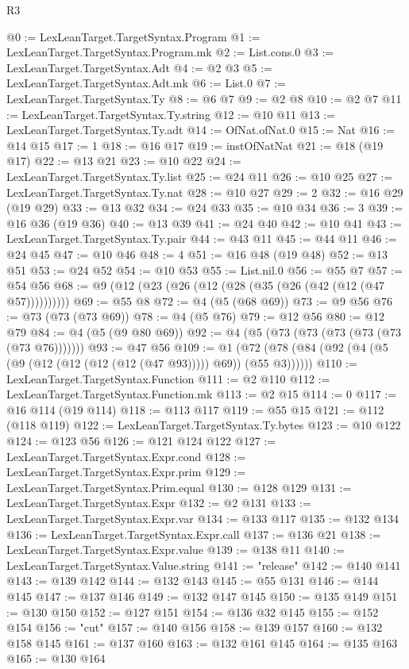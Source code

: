 \begin{lexlean}{R3}
\begin{coremodule}
@0 := LexLeanTarget.TargetSyntax.Program
@1 := LexLeanTarget.TargetSyntax.Program.mk
@2 := List.cons.{0}
@3 := LexLeanTarget.TargetSyntax.Adt
@4 := @2 @3
@5 := LexLeanTarget.TargetSyntax.Adt.mk
@6 := List.{0}
@7 := LexLeanTarget.TargetSyntax.Ty
@8 := @6 @7
@9 := @2 @8
@10 := @2 @7
@11 := LexLeanTarget.TargetSyntax.Ty.string
@12 := @10 @11
@13 := LexLeanTarget.TargetSyntax.Ty.adt
@14 := OfNat.ofNat.{0}
@15 := Nat
@16 := @14 @15
@17 := 1
@18 := @16 @17
@19 := instOfNatNat
@21 := @18 (@19 @17)
@22 := @13 @21
@23 := @10 @22
@24 := LexLeanTarget.TargetSyntax.Ty.list
@25 := @24 @11
@26 := @10 @25
@27 := LexLeanTarget.TargetSyntax.Ty.nat
@28 := @10 @27
@29 := 2
@32 := @16 @29 (@19 @29)
@33 := @13 @32
@34 := @24 @33
@35 := @10 @34
@36 := 3
@39 := @16 @36 (@19 @36)
@40 := @13 @39
@41 := @24 @40
@42 := @10 @41
@43 := LexLeanTarget.TargetSyntax.Ty.pair
@44 := @43 @11
@45 := @44 @11
@46 := @24 @45
@47 := @10 @46
@48 := 4
@51 := @16 @48 (@19 @48)
@52 := @13 @51
@53 := @24 @52
@54 := @10 @53
@55 := List.nil.{0}
@56 := @55 @7
@57 := @54 @56
@68 := @9 (@12 (@23 (@26 (@12 (@28 (@35 (@26 (@42 (@12 (@47 @57))))))))))
@69 := @55 @8
@72 := @4 (@5 (@68 @69))
@73 := @9 @56
@76 := @73 (@73 (@73 @69))
@78 := @4 (@5 @76)
@79 := @12 @56
@80 := @12 @79
@84 := @4 (@5 (@9 @80 @69))
@92 := @4 (@5 (@73 (@73 (@73 (@73 (@73 (@73 @76)))))))
@93 := @47 @56
@109 := @1 (@72 (@78 (@84 (@92 (@4 (@5 (@9 (@12 (@12 (@12 (@12 (@47 @93))))) @69)) (@55 @3))))))
@110 := LexLeanTarget.TargetSyntax.Function
@111 := @2 @110
@112 := LexLeanTarget.TargetSyntax.Function.mk
@113 := @2 @15
@114 := 0
@117 := @16 @114 (@19 @114)
@118 := @113 @117
@119 := @55 @15
@121 := @112 (@118 @119)
@122 := LexLeanTarget.TargetSyntax.Ty.bytes
@123 := @10 @122
@124 := @123 @56
@126 := @121 @124 @122
@127 := LexLeanTarget.TargetSyntax.Expr.cond
@128 := LexLeanTarget.TargetSyntax.Expr.prim
@129 := LexLeanTarget.TargetSyntax.Prim.equal
@130 := @128 @129
@131 := LexLeanTarget.TargetSyntax.Expr
@132 := @2 @131
@133 := LexLeanTarget.TargetSyntax.Expr.var
@134 := @133 @117
@135 := @132 @134
@136 := LexLeanTarget.TargetSyntax.Expr.call
@137 := @136 @21
@138 := LexLeanTarget.TargetSyntax.Expr.value
@139 := @138 @11
@140 := LexLeanTarget.TargetSyntax.Value.string
@141 := "release"
@142 := @140 @141
@143 := @139 @142
@144 := @132 @143
@145 := @55 @131
@146 := @144 @145
@147 := @137 @146
@149 := @132 @147 @145
@150 := @135 @149
@151 := @130 @150
@152 := @127 @151
@154 := @136 @32 @145
@155 := @152 @154
@156 := "cut"
@157 := @140 @156
@158 := @139 @157
@160 := @132 @158 @145
@161 := @137 @160
@163 := @132 @161 @145
@164 := @135 @163
@165 := @130 @164

\end{coremodule}
\end{lexlean}
